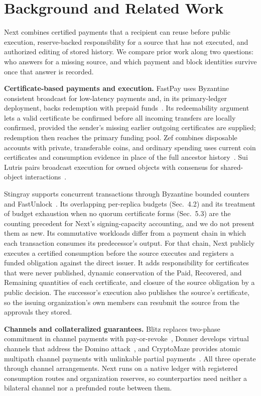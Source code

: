 \section{Background and Related Work}
\label{sec:related}

Next combines certified payments that a recipient can reuse before public
execution, reserve-backed responsibility for a source that has not executed,
and authorized editing of stored history. We compare prior work along two
questions: who answers for a missing source, and which payment and block
identities survive once that answer is recorded.

\noindent\textbf{Certificate-based payments and execution.}
FastPay uses Byzantine consistent broadcast for low-latency payments and, in
its primary-ledger deployment, backs redemption with prepaid
funds~\cite{fastpay}. Its redeemability argument lets a valid certificate be
confirmed before all incoming transfers are locally confirmed, provided the
sender's missing earlier outgoing certificates are supplied; redemption then
reaches the primary funding pool. Zef combines disposable accounts with
private, transferable coins, and ordinary spending uses current coin
certificates and consumption evidence in place of the full ancestor
history~\cite{zef}. Sui Lutris pairs broadcast execution for owned objects
with consensus for shared-object interactions~\cite{lutris}.

Stingray supports concurrent transactions through Byzantine bounded counters
and FastUnlock~\cite{stingray}. Its overlapping per-replica budgets
(Sec.~4.2) and its treatment of budget exhaustion when no quorum certificate
forms (Sec.~5.3) are the counting precedent for Next's signing-capacity
accounting, and we do not present them as new. Its commutative workloads
differ from a payment chain in which each transaction consumes its
predecessor's output. For that chain, Next publicly executes a certified
consumption before the source executes and registers a funded obligation
against the direct issuer. It adds responsibility for certificates that were
never published, dynamic conservation of the Paid, Recovered, and Remaining
quantities of each certificate, and closure of the source obligation by a
public decision. The successor's execution also publishes the source's
certificate, so the issuing organization's own members can resubmit the
source from the approvals they stored.

\noindent\textbf{Channels and collateralized guarantees.}
Blitz replaces two-phase commitment in channel payments with
pay-or-revoke~\cite{blitz}, Donner develops virtual channels that address the
Domino attack~\cite{donner}, and CryptoMaze provides atomic multipath channel
payments with unlinkable partial payments~\cite{cryptomaze}. All three operate
through channel arrangements. Next runs on a native ledger with registered
consumption routes and organization reserves, so counterparties need neither a
bilateral channel nor a prefunded route between them.

